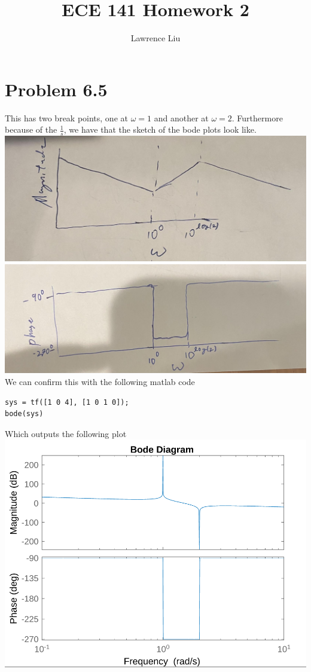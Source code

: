 \documentclass[12pt]{article}
\title{ECE 141 Homework 2}
\author{Lawrence Liu}
\begin{document}
\maketitle
\section*{Problem 6.5}

This has two break points, one at $\omega=1$ and another at $\omega=2$. Furthermore because of the $\frac{1}{s}$, we
have that the sketch of the bode plots look like.\\
\includegraphics[scale=0.2]{Problem1Fig1.png}\\
\includegraphics[scale=0.2]{Problem1Fig2.jpg}\\
We can confirm this with the following matlab code
\begin{verbatim}
sys = tf([1 0 4], [1 0 1 0]);
bode(sys)
\end{verbatim}
Which outputs the following plot\\
\includegraphics[scale=0.2]{Problem1Fig3.png}\\
\end{document}
